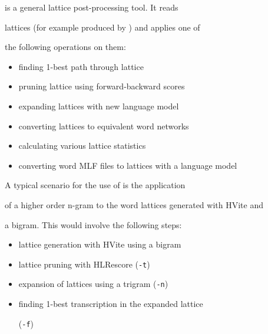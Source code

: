  is a general lattice post-processing tool. It reads


lattices (for example produced by ) and applies one of


the following operations on them:





\begin{itemize}


\item finding 1-best path through lattice


\item pruning lattice using forward-backward scores


\item expanding lattices with new language model


\item converting lattices to equivalent word networks


\item calculating various lattice statistics


\item converting word MLF files to lattices with a language model


\end{itemize}





A typical scenario for the use of  is the application


of a higher order n-gram to the word lattices generated with HVite and


a bigram. This would involve the following steps:





\begin{itemize}


\item lattice generation with HVite using a bigram


\item lattice pruning with HLRescore (\texttt{-t})


\item expansion of lattices using a trigram (\texttt{-n})


\item finding 1-best transcription in the expanded lattice


  (\texttt{-f})


\end{itemize}





